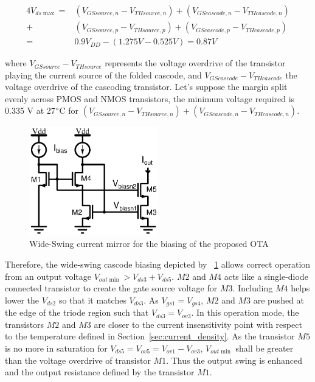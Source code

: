 \begin{eqnarray}
    4V_{ds\max} =& (V_{GSsource,n}-V_{THsource,n}) + (V_{GScascode,n}-V_{THcascode,n}) \\
    +& (V_{GSsource,p}-V_{THsource,p}) + (V_{GScascode,p}-V_{THcascode,p}) \nonumber \\
    =& 0.9 V_{DD} - (1.275 V - 0.525 V) = 0.87 V \nonumber
\end{eqnarray}
    
where \(V_{GSsource}-V_{THsource} \) represents the voltage overdrive of the transistor playing the current source of the folded cascode, and \(V_{GScascode}-V_{THcascode}\) the voltage overdrive of the cascoding transistor. Let's suppose the margin split evenly across PMOS and NMOS transistors, the minimum voltage required is 0.335 V at 27\(\degree \)C for \((V_{GSsource,n}-V_{THsource,n}) + (V_{GScascode,n}-V_{THcascode,n})\).

\begin{figure}[htp]
    \centering
    \includegraphics[width=0.5\textwidth]{Chapter7/Figs/wide-swing-current-mirror.ps}
    \caption{Wide-Swing current mirror for the biasing of the proposed OTA}
    \label{fig:wide-swing-cascode}
\end{figure}

Therefore, the wide-swing cascode biasing depicted by \figurename~\ref{fig:wide-swing-cascode} allows correct operation from an output voltage \(V_{out\min} > V_{ds3}+V_{ds5}\). \(M2 \) and \(M4 \) acts like a single-diode connected transistor to create the gate source voltage for \(M3 \). Including \(M4 \) helps lower the \(V_{ds2} \) so that it matches \(V_{ds3} \). As \(V_{gs1} = V_{gs4} \), \(M2 \) and \(M3 \) are pushed at the edge of the triode region such that \(V_{ds3} = V_{ov3}\). In this operation mode, the transistors \(M2 \) and \(M3 \) are closer to the current insensitivity point with respect to the temperature defined in Section~\ref{sec:current_density}. As the transistor \(M5 \) is no more in saturation for \(V_{ds5} = V_{ov5} = V_{ov1} - V_{ov3}\), \(V_{out\min} \) shall be greater than the voltage overdrive of transistor \(M1 \). Thus the output swing is enhanced and the output resistance defined by the transistor \(M1 \).

